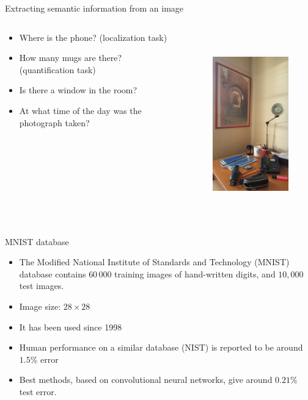 \documentclass[xcolor=pdftex,dvipsnames,table,mathserif]{beamer}
\begin{document}
\begin{frame}{Extracting semantic information from an image}

\begin{columns}
  \begin{column}{.5\textwidth}
\begin{itemize}
\item Where is the phone? (localization task)
\item How many mugs are there? (quantification task)
\item Is there a window in the room?
\item At what time of the day was the photograph taken?
\end{itemize}
  \end{column}

  \begin{column}{.5\textwidth}
    \begin{figure}[ht]
      \centering
      \includegraphics[height=8cm]{bureau-1}
    \end{figure}

  \end{column}
\end{columns}

\end{frame}

\begin{frame}{MNIST database \tiny{\cite{lecun_gradient-based_1998}}}

  \begin{itemize}
  \item The Modified National Institute of Standards and Technology (MNIST) database contains $60\,000$ training images of hand-written digits, and $10,000$ test images.
  \item Image size: $28 \times 28$
  \item It has been used since 1998
  \item Human performance on a similar database (NIST) is reported to be around $1.5\%$ error \cite{simard_efficient_1993}
  \item Best methods, based on convolutional neural networks, give around $0.21\%$ test error.
  \end{itemize}

\end{frame}
\end{document}
